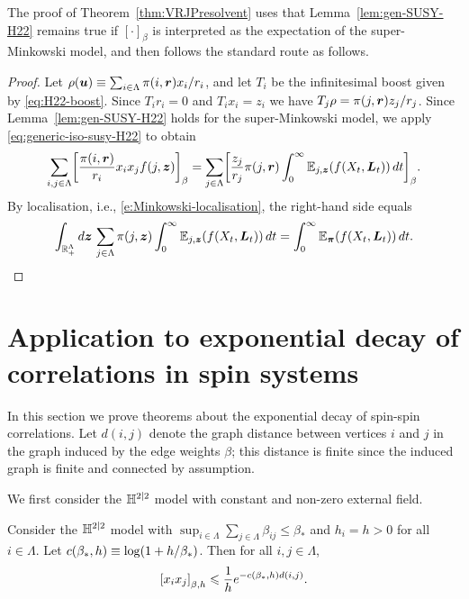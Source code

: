 \documentclass[11pt,a4paper]{article}
\begin{document}
The proof of Theorem~\ref{thm:VRJPresolvent} uses that
Lemma~\ref{lem:gen-SUSY-H22} remains true if $[\cdot]_\beta$ is
interpreted as the expectation of the super-Minkowski model,
and then follows the standard route as follows.

\begin{proof}
  Let
  $\rho(\boldsymbol{u})\equiv \sum_{i\in\Lambda} \pi(i,\boldsymbol{r})x_i/r_i$, 
  and let $T_{i}$ be the infinitesimal boost given by \eqref{eq:H22-boost}.
  Since $T_ir_i=0$ and $T_ix_i =z_i$ we have $T_j \rho = \pi(j,\boldsymbol{r})z_j/r_j$.
  Since Lemma~\ref{lem:gen-SUSY-H22} holds
  for the super-Minkowski model,
  we apply \eqref{eq:generic-iso-susy-H22} to obtain
  \begin{equation}
    \sum_{i,j\in\Lambda}\uspin{\frac{\pi(i,\V{r})}{r_i}x_ix_{j} f(j, \V{z})}_{\beta}
    =
    \sum_{j\in\Lambda} \uspin{\frac{z_j}{r_j}\pi(j,\V{r})\int_0^\infty \E_{j,\V{z}}(f(X_t,\V{L}_t))\,dt}_{\beta}
    .
  \end{equation}
  By localisation, i.e., \eqref{e:Minkowski-localisation}, the right-hand side equals
  \begin{equation*}
    \int_{\mathbb{R}_+^\Lambda} d\boldsymbol{z} \, \sum_{j\in\Lambda}\pi(j,\boldsymbol{z})
    \int_0^\infty \mathbb{E}_{j,\boldsymbol{z}}(f(X_t,\boldsymbol{L}_t))\,dt
    =
    \int_0^\infty \mathbb{E}_{\boldsymbol{\pi}}(f(X_t,\boldsymbol{L}_t))\,dt.
    \qedhere
  \end{equation*}
\end{proof}


\section{Application to exponential decay of correlations in spin
  systems} 
\label{sec:applications}

In this section we prove theorems about the exponential decay of
spin-spin correlations. Let $d(i,j)$ denote the graph
distance between vertices $i$ and $j$ in the graph induced by the
edge weights $\beta$; this distance is finite since the induced
graph is finite and connected by assumption.

We first consider the $\mathbb{H}^{2|2}$ model with constant and non-zero
external field.
\begin{theorem}
  \label{thm:exp-decay-H}
  Consider the $\mathbb{H}^{2|2}$ model with
    $\sup_{i\in\Lambda} \sum_{j\in\Lambda} \beta_{ij} \leq \beta_*$ 
  and $h_{i}=h>0$ for all $i\in\Lambda$. Let $c(\beta_*,h) \equiv
  \log(1+h/\beta_*)$. Then for all $i,j\in \Lambda$,
  \begin{equation}
    \cb{x_ix_j}_{\beta,h} \leq \frac{1}{h} e^{-c(\beta_*,h)d(i,j)}.
  \end{equation}
\end{theorem}
\end{document}
